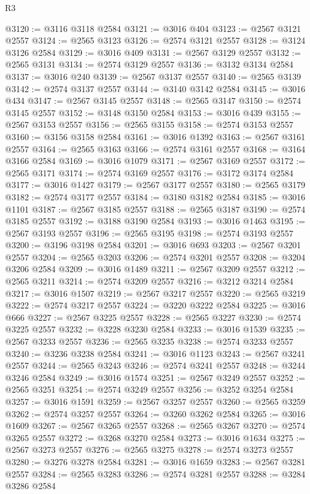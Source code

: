 \begin{lexlean}{R3}
\begin{coremodule}
@3120 := @3116 @3118 @2584
@3121 := @3016 @404
@3123 := @2567 @3121 @2557
@3124 := @2565 @3123
@3126 := @2574 @3121 @2557
@3128 := @3124 @3126 @2584
@3129 := @3016 @409
@3131 := @2567 @3129 @2557
@3132 := @2565 @3131
@3134 := @2574 @3129 @2557
@3136 := @3132 @3134 @2584
@3137 := @3016 @240
@3139 := @2567 @3137 @2557
@3140 := @2565 @3139
@3142 := @2574 @3137 @2557
@3144 := @3140 @3142 @2584
@3145 := @3016 @434
@3147 := @2567 @3145 @2557
@3148 := @2565 @3147
@3150 := @2574 @3145 @2557
@3152 := @3148 @3150 @2584
@3153 := @3016 @439
@3155 := @2567 @3153 @2557
@3156 := @2565 @3155
@3158 := @2574 @3153 @2557
@3160 := @3156 @3158 @2584
@3161 := @3016 @1392
@3163 := @2567 @3161 @2557
@3164 := @2565 @3163
@3166 := @2574 @3161 @2557
@3168 := @3164 @3166 @2584
@3169 := @3016 @1079
@3171 := @2567 @3169 @2557
@3172 := @2565 @3171
@3174 := @2574 @3169 @2557
@3176 := @3172 @3174 @2584
@3177 := @3016 @1427
@3179 := @2567 @3177 @2557
@3180 := @2565 @3179
@3182 := @2574 @3177 @2557
@3184 := @3180 @3182 @2584
@3185 := @3016 @1101
@3187 := @2567 @3185 @2557
@3188 := @2565 @3187
@3190 := @2574 @3185 @2557
@3192 := @3188 @3190 @2584
@3193 := @3016 @1463
@3195 := @2567 @3193 @2557
@3196 := @2565 @3195
@3198 := @2574 @3193 @2557
@3200 := @3196 @3198 @2584
@3201 := @3016 @693
@3203 := @2567 @3201 @2557
@3204 := @2565 @3203
@3206 := @2574 @3201 @2557
@3208 := @3204 @3206 @2584
@3209 := @3016 @1489
@3211 := @2567 @3209 @2557
@3212 := @2565 @3211
@3214 := @2574 @3209 @2557
@3216 := @3212 @3214 @2584
@3217 := @3016 @1507
@3219 := @2567 @3217 @2557
@3220 := @2565 @3219
@3222 := @2574 @3217 @2557
@3224 := @3220 @3222 @2584
@3225 := @3016 @666
@3227 := @2567 @3225 @2557
@3228 := @2565 @3227
@3230 := @2574 @3225 @2557
@3232 := @3228 @3230 @2584
@3233 := @3016 @1539
@3235 := @2567 @3233 @2557
@3236 := @2565 @3235
@3238 := @2574 @3233 @2557
@3240 := @3236 @3238 @2584
@3241 := @3016 @1123
@3243 := @2567 @3241 @2557
@3244 := @2565 @3243
@3246 := @2574 @3241 @2557
@3248 := @3244 @3246 @2584
@3249 := @3016 @1574
@3251 := @2567 @3249 @2557
@3252 := @2565 @3251
@3254 := @2574 @3249 @2557
@3256 := @3252 @3254 @2584
@3257 := @3016 @1591
@3259 := @2567 @3257 @2557
@3260 := @2565 @3259
@3262 := @2574 @3257 @2557
@3264 := @3260 @3262 @2584
@3265 := @3016 @1609
@3267 := @2567 @3265 @2557
@3268 := @2565 @3267
@3270 := @2574 @3265 @2557
@3272 := @3268 @3270 @2584
@3273 := @3016 @1634
@3275 := @2567 @3273 @2557
@3276 := @2565 @3275
@3278 := @2574 @3273 @2557
@3280 := @3276 @3278 @2584
@3281 := @3016 @1659
@3283 := @2567 @3281 @2557
@3284 := @2565 @3283
@3286 := @2574 @3281 @2557
@3288 := @3284 @3286 @2584

\end{coremodule}
\end{lexlean}
